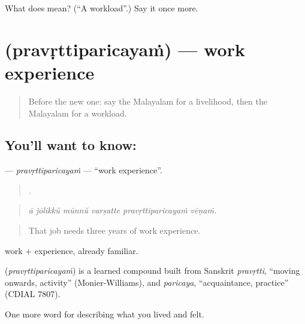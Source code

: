 \begin{tcolorbox}[breakable,colback=teal!4,colframe=teal!35!black,title={Before you move on}]
What does  mean? (\textquotedblleft{}A workload\textquotedblright{}.) Say it once more.
\end{tcolorbox}
\section[\texorpdfstring{\ml{പ്രവൃത്തിപരിചയം} (pravṛttiparicayaṁ)}{പ്രവൃത്തിപരിചയം (pravṛttiparicayaṁ)}]{ (pravṛttiparicayaṁ) — work experience}

\label{lesson:ML-C546-pravrttiparicayam}



\begin{quote}
Before the new one: say the Malayalam for a livelihood, then the Malayalam for a workload.
\end{quote}

\subsection*{You'll want to know: }
\textbf{} — \emph{pravṛttiparicayaṁ} — \textquotedblleft{}work experience\textquotedblright{}.

\begin{quote}
     .
\end{quote}

\begin{quote}
\emph{ā jōlikkŭ mūnnŭ varṣatte pravṛttiparicayaṁ vēṇaṁ.}
\end{quote}

\begin{quote}
That job needs three years of work experience.
\end{quote}

 work +  experience, already familiar.

\begin{cousinweb}
\textbf{} (\emph{pravṛttiparicayaṁ}) is a learned compound built from Sanskrit \emph{pravṛtti}, \textquotedblleft{}moving onwards, activity\textquotedblright{} (Monier-Williams), and \emph{paricaya}, \textquotedblleft{}acquaintance, practice\textquotedblright{} (CDIAL 7807).
\end{cousinweb}

\begin{grammarlens}[title={What you've built}]
One more word for describing what you lived and felt.
\end{grammarlens}

